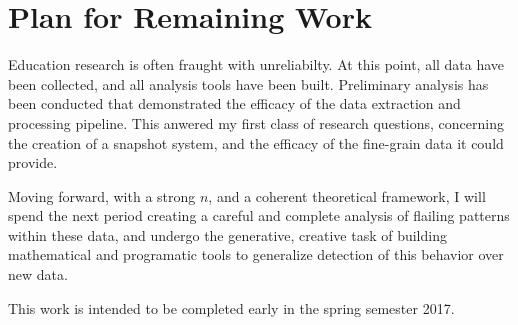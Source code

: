 \chapter{Plan for Remaining Work} %

Education research is often fraught with unreliabilty. At this point, all data have been collected, and all analysis tools have been built. Preliminary analysis has been conducted that demonstrated the efficacy of the data extraction and processing pipeline. This anwered my first class of research questions, concerning the creation of a snapshot system, and the efficacy of the fine-grain data it could provide. 

Moving forward, with a strong $n$, and a coherent theoretical framework, I will spend the next period creating a careful and complete analysis of flailing patterns within these data, and undergo the generative, creative task of building mathematical and programatic tools to generalize detection of this behavior over new data. 

This work is intended to be completed early in the spring semester 2017.
	


\label{sec:recommendations}


\label{sec:futurework}



